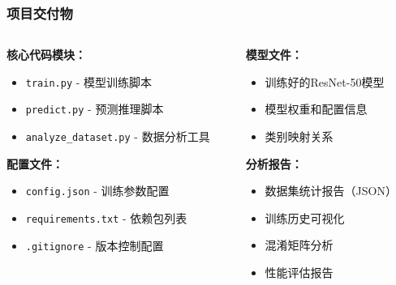\documentclass[10pt]{beamer}
\begin{document}
\begin{frame}
\frametitle{项目交付物}
\begin{columns}
\begin{column}{0.5\textwidth}
\textbf{核心代码模块：}
\begin{itemize}
    \item \texttt{train.py} - 模型训练脚本
    \item \texttt{predict.py} - 预测推理脚本
    \item \texttt{analyze\_dataset.py} - 数据分析工具
\end{itemize}

\vspace{0.3cm}
\textbf{配置文件：}
\begin{itemize}
    \item \texttt{config.json} - 训练参数配置
    \item \texttt{requirements.txt} - 依赖包列表
    \item \texttt{.gitignore} - 版本控制配置
\end{itemize}
\end{column}

\begin{column}{0.5\textwidth}
\textbf{模型文件：}
\begin{itemize}
    \item 训练好的ResNet-50模型
    \item 模型权重和配置信息
    \item 类别映射关系
\end{itemize}

\vspace{0.3cm}
\textbf{分析报告：}
\begin{itemize}
    \item 数据集统计报告（JSON）
    \item 训练历史可视化
    \item 混淆矩阵分析
    \item 性能评估报告
\end{itemize}
\end{column}
\end{columns}
\end{frame}
\end{document}

